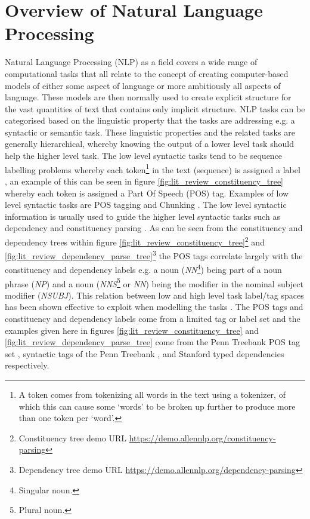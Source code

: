 \section{Overview of Natural Language Processing}
Natural Language Processing (NLP) as a field covers a wide range of computational tasks that all relate to the concept of creating computer-based models of either some aspect of language or more ambitiously all aspects of language. These models are then normally used to create explicit structure for the vast quantities of text that contains only implicit structure. NLP tasks can be categorised based on the linguistic property that the tasks are addressing e.g. a syntactic or semantic task. These linguistic properties and the related tasks are generally hierarchical, whereby knowing the output of a lower level task should help the higher level task. The low level syntactic tasks tend to be sequence labelling problems whereby each token\footnote{A token comes from tokenizing all words in the text using a tokenizer, of which this can cause some `words' to be broken up further to produce more than one token per `word'.} \citep{kaplan2005method,dridan-oepen-2012-tokenization} in the text (sequence) is assigned a label \citep{yannakoudakis-etal-2017-neural}, an example of this can be seen in figure \ref{fig:lit_review_constituency_tree} whereby each token is assigned a Part Of Speech (POS) tag. Examples of low level syntactic tasks are POS tagging \citep{church-1988-stochastic, ling-etal-2015-finding} and Chunking \citep{tjong-kim-sang-buchholz-2000-introduction}. The low level syntactic information is usually used to guide the higher level syntactic tasks such as dependency \citep{nivre-etal-2007-conll} and constituency parsing \citep{collins-2003-head}. As can be seen from the constituency and dependency trees within figure \ref{fig:lit_review_constituency_tree}\footnote{Constituency tree demo URL \url{https://demo.allennlp.org/constituency-parsing}} and \ref{fig:lit_review_dependency_parse_tree}\footnote{Dependency tree demo URL \url{https://demo.allennlp.org/dependency-parsing}} the POS tags correlate largely with the constituency and dependency labels e.g. a noun (\textit{NN}\footnote{Singular noun.}) being part of a noun phrase (\textit{NP}) and a noun (\textit{NNS}\footnote{Plural noun.} or \textit{NN}) being the modifier in the nominal subject modifier (\textit{NSUBJ}). This relation between low and high level task label/tag spaces has been shown effective to exploit when modelling the tasks \citep{hashimoto-etal-2017-joint}. The POS tags and constituency and dependency labels come from a limited tag or label set and the examples given here in figures \ref{fig:lit_review_constituency_tree} and \ref{fig:lit_review_dependency_parse_tree} come from the Penn Treebank POS tag set \citep{taylor2003penn}, syntactic tags of the Penn Treebank \citep{taylor2003penn}, and Stanford typed dependencies \citep{de2008stanford} respectively.

